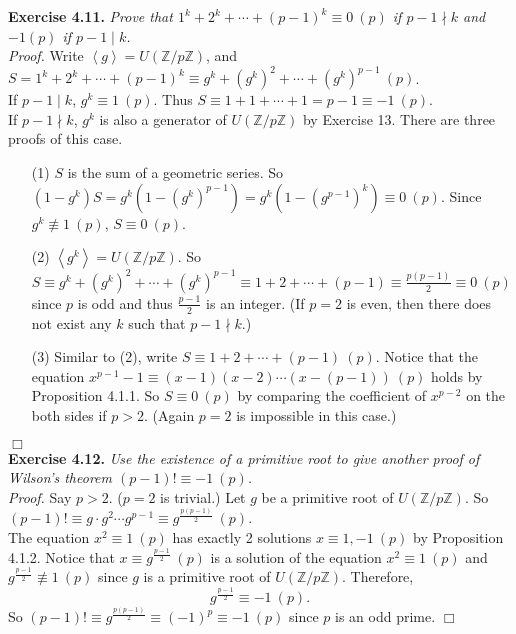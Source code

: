 \documentclass{article}
\begin{document}
\textbf{Exercise 4.11.} \emph{Prove that $1^k + 2^k + \cdots + (p-1)^k \equiv 0 \: (p)$
if $p - 1 \nmid k$ and $-1 (p)$ if $p - 1 \mid k$.} \\

\emph{Proof.}
Write $\left \langle g \right \rangle = U(\mathbb{Z}/p\mathbb{Z})$, and
$S = 1^k + 2^k + \cdots + (p-1)^k \equiv g^k + (g^k)^2 + \cdots + (g^k)^{p - 1} \: (p)$. \\

If $p - 1 \mid k$, $g^k \equiv 1 \: (p)$. Thus
$S \equiv 1 + 1 + \cdots + 1 = p - 1 \equiv -1 \: (p)$. \\

If $p - 1 \nmid k$, $g^k$ is also a generator of $U(\mathbb{Z}/p\mathbb{Z})$ by Exercise 13.
There are three proofs of this case.
\begin{enumerate}
\item[(1)]
$S$ is the sum of a geometric series.
So $(1 - g^k) S = g^k (1 - (g^k)^{p - 1}) = g^k (1 - (g^{p - 1})^k) \equiv 0 \: (p)$.
Since $g^k \not\equiv 1 \: (p)$, $S \equiv 0 \: (p)$.
\item[(2)]
$\left \langle g^k \right \rangle = U(\mathbb{Z}/p\mathbb{Z})$. So
$S \equiv g^k + (g^k)^2 + \cdots + (g^k)^{p - 1} \equiv 1 + 2 + \cdots + (p - 1)
\equiv \frac{p(p - 1)}{2} \equiv 0 \: (p)$ since $p$ is odd and
thus $\frac{p - 1}{2}$ is an integer.
(If $p = 2$ is even, then there does not exist any $k$ such that $p - 1 \nmid k$.)
\item[(3)]
Similar to (2), write $S \equiv 1 + 2 + \cdots + (p - 1) \: (p)$. Notice that the equation
$x^{p - 1} - 1 \equiv (x - 1)(x - 2) \cdots (x - (p - 1)) \: (p)$ holds by Proposition 4.1.1.
So $S \equiv 0 \: (p)$ by comparing the coefficient of $x^{p - 2}$ on the both sides if $p > 2$.
(Again $p = 2$ is impossible in this case.)
\end{enumerate}

$\Box$ \\



\textbf{Exercise 4.12.} \emph{Use the existence of a primitive root to give another proof
of Wilson's theorem $(p - 1)! \equiv -1 \: (p)$.} \\

\emph{Proof.}
Say $p > 2$. ($p = 2$ is trivial.)
Let $g$ be a primitive root of $U(\mathbb{Z}/p\mathbb{Z})$.
So $(p - 1)! \equiv g \cdot g^2 \cdots g^{p - 1} \equiv g^{\frac{p(p - 1)}{2}} \: (p)$. \\

The equation $x^2 \equiv 1 \: (p)$ has exactly 2 solutions $x \equiv 1, -1 \: (p)$
by Proposition 4.1.2.
Notice that $x \equiv g^{\frac{p - 1}{2}} \: (p)$ is a solution of the equation
$x^2 \equiv 1 \: (p)$ and $g^{\frac{p - 1}{2}} \not\equiv 1 \: (p)$
since $g$ is a primitive root of $U(\mathbb{Z}/p\mathbb{Z})$.
Therefore, $$g^{\frac{p - 1}{2}} \equiv -1 \: (p).$$
So $(p - 1)! \equiv g^{\frac{p(p - 1)}{2}} \equiv (-1)^p \equiv -1 \: (p)$
since $p$ is an odd prime.
$\Box$ \\
\end{document}

